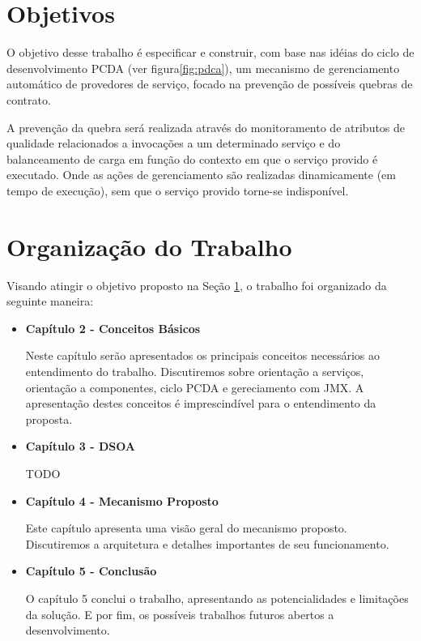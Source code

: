 \section{Objetivos}
\label{sec:obj}

O objetivo desse trabalho é especificar e construir, com base nas idéias do ciclo de desenvolvimento PCDA (ver figura\ref{fig:pdca}), um mecanismo de gerenciamento automático de provedores de serviço, focado na prevenção de possíveis quebras de contrato.

A prevenção da quebra será realizada através do monitoramento de atributos de qualidade relacionados a invocações a um determinado serviço e do balanceamento de carga em função do contexto em que o serviço provido é executado. Onde as ações de gerenciamento são realizadas dinamicamente (em tempo de execução), sem que o serviço provido torne-se indisponível.



\section{Organização do Trabalho}
Visando atingir o objetivo proposto na Seção \ref{sec:obj}, o trabalho foi organizado da seguinte maneira:
\begin{itemize}

\item \textbf{Capítulo 2 - Conceitos Básicos}

Neste capítulo serão apresentados os principais conceitos necessários ao entendimento do trabalho. Discutiremos sobre orientação a serviços, orientação a componentes, ciclo PCDA e gereciamento com JMX. A apresentação destes conceitos é imprescindível para o entendimento da proposta.

\item \textbf{Capítulo 3 - DSOA}

TODO

\item \textbf{Capítulo 4 - Mecanismo Proposto}

Este capítulo apresenta uma visão geral do mecanismo proposto. Discutiremos a arquitetura e detalhes importantes de seu funcionamento.

\item \textbf{Capítulo 5 - Conclusão}

O capítulo 5 conclui o trabalho, apresentando as potencialidades e limitações da solução. E por fim, os possíveis trabalhos futuros abertos a desenvolvimento.

\end{itemize}

